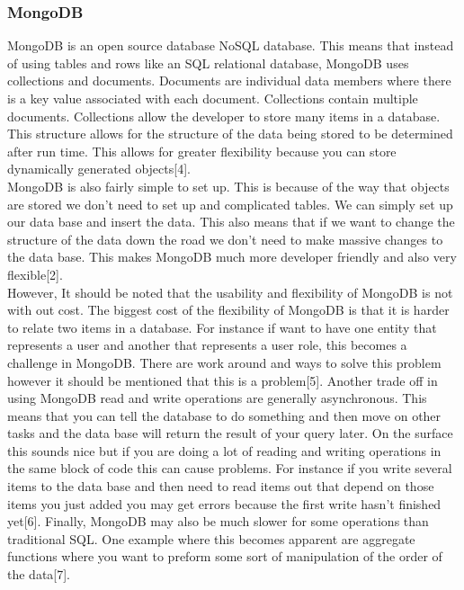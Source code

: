 \documentclass[onecolumn, draftclsnofoot,10pt, compsoc]{article}
\begin{document}
		\subsubsection{MongoDB}
		MongoDB is an open source database NoSQL database. This means that instead of using tables and rows like an SQL relational database, MongoDB uses collections and documents. Documents are individual data members where there is a key value associated with each document. Collections contain multiple documents. Collections allow the developer to store many items in a database. This structure allows for the structure of the data being stored to be determined after run time. This allows for greater flexibility because you can store dynamically generated objects[4].\\
		MongoDB is also fairly simple to set up. This is because of the way that objects are stored we don't need to set up and complicated tables. We can simply set up our data base and insert the data. This also means that if we want to change the structure of the data down the road we don't need to make massive changes to the data base. This makes MongoDB much more developer friendly and also very flexible[2].\\
		However, It should be noted that the usability and flexibility of MongoDB is not with out cost. The biggest cost of the flexibility of MongoDB is that it is harder to relate two items in a database. For instance if want to have one entity that represents a user and another that represents a user role, this becomes a challenge in MongoDB. There are work around and ways to solve this problem however it should be mentioned that this is a problem[5]. Another trade off in using MongoDB read and write operations are generally asynchronous. This means that you can tell the database to do something and then move on other tasks and the data base will return the result of your query later. On the surface this sounds nice but if you are doing a lot of reading and writing operations in the same block of code this can cause problems. For instance if you write several items to the data base and then need to read items out that depend on those items you just added you may get errors because the first write hasn't finished yet[6]. Finally, MongoDB may also be much slower for some operations than traditional SQL. One example where this becomes apparent are aggregate functions where you want to preform some sort of manipulation of the order of the data[7].\\
	
\end{document}
